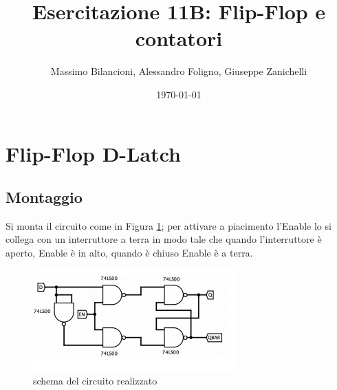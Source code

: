 \documentclass[10pt,a4paper]{article}
\date{\today}
\title{Esercitazione 11B: Flip-Flop e contatori}
\author{Massimo Bilancioni, Alessandro Foligno, Giuseppe Zanichelli}
\begin{document}
	
\maketitle
	
\section{ Flip-Flop D-Latch}
\subsection{Montaggio}
 Si monta il circuito come in Figura \ref{circ}; per attivare a piacimento l'Enable lo si collega con un interruttore a terra in modo tale che quando l'interruttore è aperto, Enable è in alto, quando è chiuso Enable è a terra.
 \begin{figure}[h]
 	\label{circ}
 	\includegraphics[scale=1]{circuito.png}

 	\caption{schema del circuito realizzato}
 \end{figure}
\end{document}
